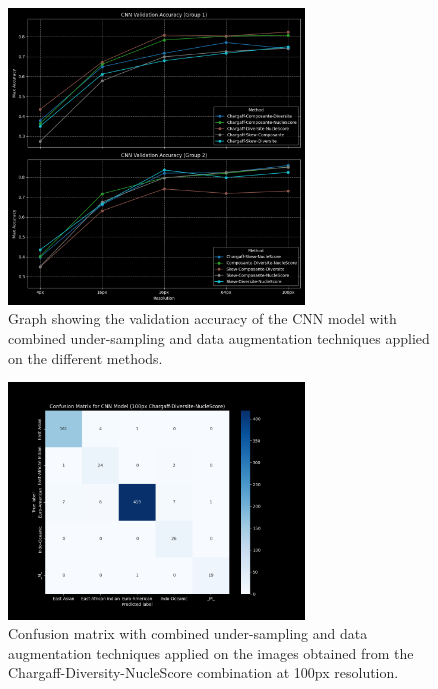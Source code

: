 \begin{appendices}
	\begin{figure}[H]
		\centering
		\includegraphics[width=0.7\textwidth]{../imgs/graphs/kfold-undersample/cnn_validation_accuracy_groups_mask_5_kfold_aug-under.png}
		\caption{Graph showing the validation accuracy of the CNN model with combined under-sampling and data augmentation
			techniques applied on the different methods.}
		\label{fig:combined_techniques_accuracy}
	\end{figure}

	\begin{figure}[H]
		\centering
		\includegraphics[width=0.7\textwidth]{../imgs/graphs/kfold-undersample/cnn_confusion_matrix_100px_mask_5-kfold_aug-under.png}
		\caption{Confusion matrix with combined under-sampling and data augmentation techniques
			applied on the images obtained from the Chargaff-Diversity-NucleScore combination at 100px resolution.}
		\label{fig:combined_techniques_confusion_matrix}
	\end{figure}


\end{appendices}
